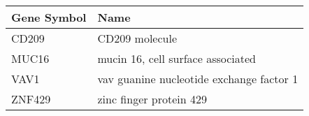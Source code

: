 \begin{tabular}{ll}
\toprule
Gene Symbol &                                     Name \\
\midrule
      CD209 &                           CD209 molecule \\
      MUC16 &        mucin 16, cell surface associated \\
       VAV1 & vav guanine nucleotide exchange factor 1 \\
     ZNF429 &                  zinc finger protein 429 \\
\bottomrule
\end{tabular}
